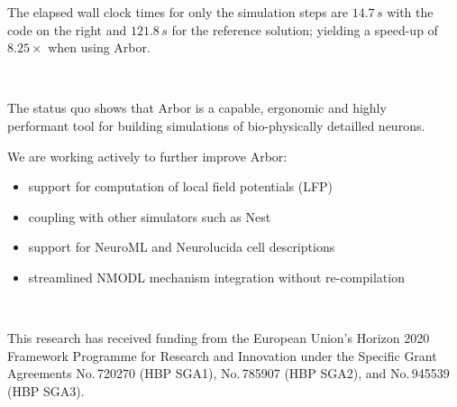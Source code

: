 \documentclass{beamer}
\begin{document}
\begin{frame}[t, fragile]
\begin{columns}[T]
\begin{column}{.49\linewidth}
      The elapsed wall clock times for only the simulation steps are $14.7\,s$
      with the code on the right and $121.8\,s$ for the reference solution;
      yielding a speed-up of $8.25\times$ when using Arbor.
    \end{column}
    \begin{column}{.49\linewidth}
      \inputminted[bgcolor=lightgray,escapeinside=!!]{python}{src/model.py}
    \end{column}
  \end{columns}
  \begin{columns}[T]
    \begin{column}{.49\linewidth}
      \textbf{}\\
      The status quo shows that Arbor is a capable, ergonomic and highly
      performant tool for building simulations of bio-physically detailled
      neurons.

      We are working actively to further improve Arbor:
      \begin{itemize}
        \item support for computation of local field potentials (LFP)
        \item coupling with other simulators such as Nest
        \item support for NeuroML and Neurolucida cell descriptions
        \item streamlined NMODL mechanism integration without re-compilation
      \end{itemize}
    \end{column}
    \begin{column}{.49\linewidth}
      \textbf{}\\
      \printbibliography{}
    \end{column}
  \end{columns}

      \textbf{}\\
      This research has received funding from the European Union's Horizon 2020
      Framework Programme for Research and Innovation under the Specific Grant
      Agreements No.\,720270 (HBP SGA1), No.\,785907 (HBP SGA2), and No.\,945539
      (HBP SGA3).\\[1.5ex]
\end{frame}
\end{document}

